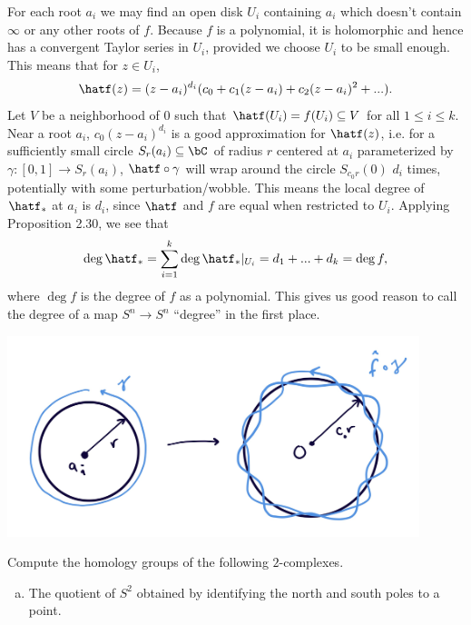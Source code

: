 \begin{homework}[e]
\begin{prf}
    For each root $a_i$ we may find an open disk $U_i$ containing $a_i$ which doesn't contain $\infty$ or any other roots of $f$. Because $f$ is a polynomial, it is holomorphic and hence has a convergent Taylor series in $U_i$, provided we choose $U_i$ to be small enough. This means that for $z \in U_i$,
    \begin{align*}
      \hatf(z) = (z - a_i)^{d_i}(c_0 + c_1(z-a_i) + c_2(z-a_i)^2+...).
    \end{align*}
    Let $V$ be a neighborhood of $0$ such that $\hatf(U_i) = f(U_i) \subseteq V$ for all $1\leq i\leq k$. Near a root $a_i$, $c_0(z - a_i)^{d_i}$ is a good approximation for $\hatf(z)$, i.e. for a sufficiently small circle $S_r(a_i)\subseteq \bC$ of radius $r$ centered at $a_i$ parameterized by $\gamma:[0,1]\to S_r(a_i)$, $\hatf\circ \gamma$ will wrap around the circle $S_{c_0r}(0)$ $d_i$ times, potentially with some perturbation/wobble. This means the local degree of $\hatf_*$ at $a_i$ is $d_i$, since $\hatf$ and $f$ are equal when restricted to $U_i$. Applying Proposition 2.30, we see that
    \begin{align*}
      \deg \hatf_* = \sum_{i=1}^k \deg \hatf_*|_{U_i} = d_1 + ... + d_k = \deg f,
    \end{align*}
    where $\deg f$ is the degree of $f$ as a polynomial. This gives us good reason to call the degree of a map $S^n \to S^n$ ``degree'' in the first place.
    \begin{center}
      \includegraphics[width=12cm]{figures/hwk10-fig1.png}
      \label{fig:prob1-1}
    \end{center}
  \end{prf}
   Compute the homology groups of the following $2$-complexes.
  \begin{enumerate}[(a)]
    \item The quotient of $S^2$ obtained by identifying the north and south poles to a point.

\end{enumerate}
\end{homework}
